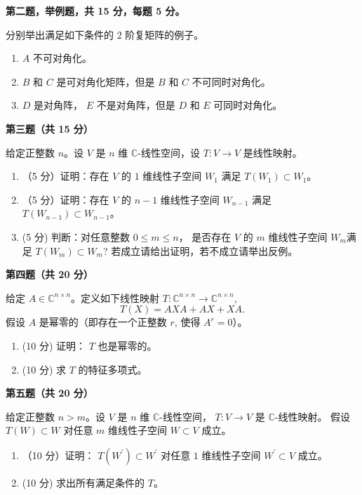 \textbf{第二题，举例题，共 15 分，每题 5 分。}

分别举出满足如下条件的 $2$ 阶复矩阵的例子。
\begin{enumerate}
  \item $A$ 不可对角化。
  \item $B$ 和 $C$ 是可对角化矩阵，但是 $B$ 和 $C$ 不可同时对角化。
  \item $D$ 是对角阵， $E$ 不是对角阵，但是 $D$ 和 $E$ 可同时对角化。
\end{enumerate}

\textbf{第三题（共 15 分）}

给定正整数 $n$。设 $V$ 是 $n$ 维 $\mathbb{C}$-线性空间，设 $T: V \rightarrow V$ 是线性映射。\\
\begin{enumerate}
  \item （5 分）证明：存在 $V$ 的 $1$ 维线性子空间 $W_{1}$ 满足 $T(W_{1}) \subset W_{1}$。
  \item （5 分）证明：存在 $V$ 的 $n-1$ 维线性子空间 $W_{n-1}$ 满足 $T(W_{n-1}) \subset W_{n-1}$。
  \item (5 分) 判断：对任意整数 $0 \leq m \leq n$，
  是否存在 $V$ 的 $m$ 维线性子空间 $W_{m}$满足 $T(W_{m}) \subset W_{m}$? 
  若成立请给出证明，若不成立请举出反例。
\end{enumerate}

\textbf{第四题（共 20 分）}

给定 $A \in \mathbb{C}^{n \times n}$。定义如下线性映射 $T: \mathbb{C}^{n \times n} \rightarrow \mathbb{C}^{n \times n}$,
$$T(X)=A X A+A X+X A.$$
假设 $A$ 是幂零的（即存在一个正整数 $r$, 使得 $A^{r}=0$）。
\begin{enumerate}
  \item (10 分) 证明： $T$ 也是幂零的。
  \item (10 分) 求 $T$ 的特征多项式。
\end{enumerate}

\textbf{第五题（共 20 分）}

给定正整数 $n>m$。设 $V$ 是 $n$ 维 $\mathbb{C}$-线性空间， 
$T: V \rightarrow V$ 是 $\mathbb{C}$-线性映射。
假设 $T(W) \subset W$ 对任意 $m$ 维线性子空间 $W \subset V$ 成立。
\begin{enumerate}
\item（10 分）证明： $T(W^{\prime}) \subset W^{\prime}$ 对任意 $1$ 维线性子空间 $W^{\prime} \subset V$ 成立。\\
\item (10 分) 求出所有满足条件的 $T$。
\end{enumerate}

